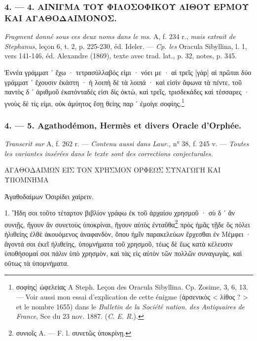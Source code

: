 \documentclass[a4paper, 11pt, oneside, polutonikogreek, french]{article}
\begin{document}
\bigskip
\centerline{\EightStarTaper}
\centerline{\EightStarTaper\EightStarTaper}
\bigskip

\subsubsection{4. --- 4. ΑΙΝΙΓΜΑ ΤΟΥ ΦΙΛΟΣΟΦΙΚΟΥ ΛΙΘΟΥ ΕΡΜΟΥ ΚΑΙ ΑΓΑΘΟΔΑΙΜΟΝΟΣ.}

\emph{Fragment donné sous ces deux noms dans le ms.} A, f. 234 r., \emph{mais extrait de Stephanus}, leçon 6, t. 2, p. 225-230, éd. Ideler. --- \emph{Cp. les} Oracula Sibyllina, l. 1, vers 141-146, éd. Alexandre (1869), texte avec trad. lat., p. 32, notes, p. 345.

\bigskip

Ἐννέα γράμματ ᾽ ἔχω · τετρασύλλαβός εἰμι · νόει με ·  
αἱ τρεῖς [γὰρ] αἱ πρῶται δύο γράμματ ᾽ ἔχουσιν ἑκάστη ·  
ἡ λοιπὴ δὲ τὰ λοιπά · καὶ εἰσὶν ἄφωνα τὰ πέντε,  
τοῦ παντὸς δ ᾽ ἀριθμοῦ ἑκατόνταδές εἰσι δὶς ὀκτὼ,  
καὶ τρεῖς, τρισδεκάδες καὶ τέσσαρες · γνοὺς δὲ τίς εἰμι,  
οὐκ ἀμύητος ἔσῃ θείης παρ ᾽ ἐμοίγε σοφίης.\footnote{σοφίης] ὠφελείας A Steph. Leçon des Oracula Sibyllina. Cp. Zosime, 3, 6, 13. --- Voir aussi mon essai d'explication de cette énigme (ἀρσενικὸς < λίθος ? > et le nombre 1655) dans le \emph{Bulletin de la Société nation. des Antiquaires de France}, Sce du 23 nov. 1887. (\emph{C. E. R.}).}

\bigskip
\centerline{\EightStarTaper}
\centerline{\EightStarTaper\EightStarTaper}
\bigskip

\subsubsection{4. --- 5. Agathodémon, Hermès et divers Oracle d'Orphée.}

\emph{Transcrit sur} A, f. 262 r. --- \emph{Contenu aussi dans Laur.}, n° 38, f. 245 v. --- \emph{Toutes les variantes insérées dans le texte sont des corrections conjecturales.}

\bigskip

ΑΓΑΘΟΔΑΙΜΩΝ ΕΙΣ ΤΟΝ ΧΡΗΣΜΟΝ ΟΡΦΕΩΣ ΣΥΝΑΓΩΓΗ ΚΑΙ ΥΠΟΜΝΗΜΑ

Ἀγαθοδαίμων Ὀσιρίδει χαίρειν.

1. Ἤδη σοι τοῦτο τέταρτον βιβλίον γράφω ἐκ τοῦ ἀρχαίου χρησμοῦ · σὺ δ ᾽ ἂν συνιῇς, ἤγουν ἂν συνετοὺς ὑποκρίναι, ἤγουν αὐτὸς ἐνταῦθα\footnote{συνιοῖς A. --- F. l. συνετῶς ὑποκρίνῃ.} πρὸς ἡμᾶς τῇδε ὃς πόλει ἠλιθείης ἐλθὲ ἀκουόμενος ἀναφανδὸν, ὅπου ἡμῖν παρακελεύων ἔρχεσθαι ἐν Μέμφει · ἄγοντά σοι ἐκεῖ ἠλιθείης, ὑπομνήματα τοῦ χρησμοῦ, τέως δὲ ἕως κατὰ κέλευσιν ὑποθήσομαί σοι πάλιν ὑπὸ χρησμὸν, καὶ τὰς εἰς αὐτὸν τῶν πολλῶν συναγωγὰς, καὶ οὕτως τὰ ὑπομνήματα.
\end{document}
